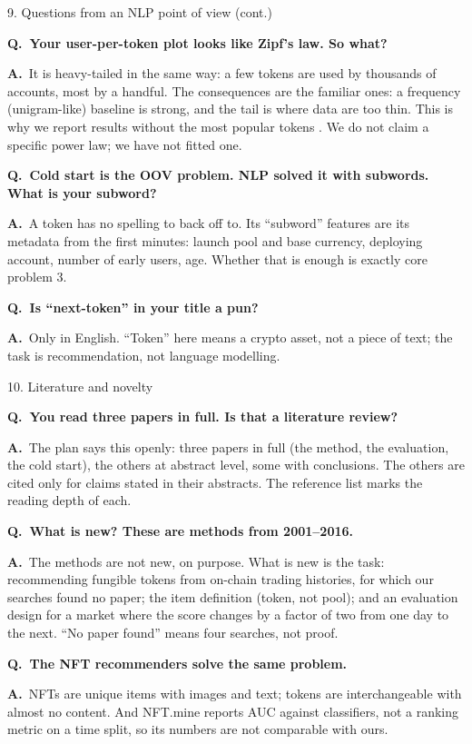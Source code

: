 \documentclass[aspectratio=169,10pt]{beamer}
\newcommand{\Q}[1]{\par{\color{orange}\bfseries Q.\ #1}\par\smallskip}
\newcommand{\A}{{\color{teal}\bfseries A.}\ }
\newcommand{\toindex}{\hfill\hyperlink{index}{\beamerreturnbutton{index}}}
\newcommand{\qsep}{\par\medskip{\color{grey!40}\hrule}\medskip}
\begin{document}
\begin{frame}{9. Questions from an NLP point of view (cont.) \toindex}
  \footnotesize
  \Q{Your user-per-token plot looks like Zipf's law. So what?}
  \A It is heavy-tailed in the same way: a few tokens are used by thousands of accounts, most by a handful. The consequences are the familiar ones: a frequency (unigram-like) baseline is strong, and the tail is where data are too thin. This is why we report results without the most popular tokens \cite{cremonesi2010}. We do not claim a specific power law; we have not fitted one.
  \qsep
  \Q{Cold start is the OOV problem. NLP solved it with subwords. What is your subword?}
  \A A token has no spelling to back off to. Its ``subword'' features are its metadata from the first minutes: launch pool and base currency, deploying account, number of early users, age. Whether that is enough is exactly core problem 3.
  \qsep
  \Q{Is ``next-token'' in your title a pun?}
  \A Only in English. ``Token'' here means a crypto asset, not a piece of text; the task is recommendation, not language modelling.
\end{frame}

\begin{frame}[label=qlit]{10. Literature and novelty \toindex}
  \footnotesize
  \Q{You read three papers in full. Is that a literature review?}
  \A The plan says this openly: three papers in full (the method, the evaluation, the cold start), the others at abstract level, some with conclusions. The others are cited only for claims stated in their abstracts. The reference list marks the reading depth of each.
  \qsep
  \Q{What is new? These are methods from 2001--2016.}
  \A The methods are not new, on purpose. What is new is the task: recommending fungible tokens from on-chain trading histories, for which our searches found no paper; the item definition (token, not pool); and an evaluation design for a market where the score changes by a factor of two from one day to the next. ``No paper found'' means four searches, not proof.
  \qsep
  \Q{The NFT recommenders \cite{choi2024,nftmine2023} solve the same problem.}
  \A NFTs are unique items with images and text; tokens are interchangeable with almost no content. And NFT.mine reports AUC against classifiers, not a ranking metric on a time split, so its numbers are not comparable with ours.
\end{frame}
\end{document}
